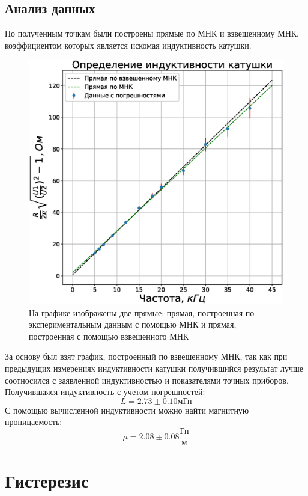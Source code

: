 \documentclass[a4paper,14pt]{extarticle}
\begin{document}
		\subsection{Анализ данных}
			По полученным точкам были построены прямые по МНК и взвешенному МНК, коэффициентом которых является искомая индуктивность катушки.
			\begin{figure}[h]
				\centering
				\includegraphics[width=.80\linewidth]{Lab2_1.eps}
				\caption{На графике изображены две прямые: прямая, построенная по экспериментальным данным с помощью МНК и прямая, построенная с помощью взвешенного МНК}
				\label{fig2}
			\end{figure} 
			\newpage
			За основу был взят график, построенный по взвешенному МНК, так как при предыдущих измерениях индуктивности катушки получившийся результат лучше соотносился с заявленной индуктивностью и показателями точных приборов. Получившаяся индуктивность с учетом погрешностей:
			\begin{equation}	
				L = 2.73 \pm 0.10\text{мГн}
			\end{equation}
			С помощью вычисленной индуктивности можно найти магнитную проницаемость:
			\begin{equation}
				\mu = 2.08 \pm 0.08\frac{\text{Гн}}{\text{м}}
			\end{equation}
	\section{Гистерезис}
\end{document}

